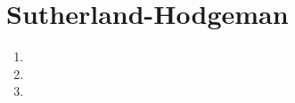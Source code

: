 \section*{Sutherland-Hodgeman}

  \begin{enumerate}[label=\arabic*)]\addtocounter{enumi}{31}
   
   		\item 
   		
       \item 
 			  
       \item 
       
   \end{enumerate}
